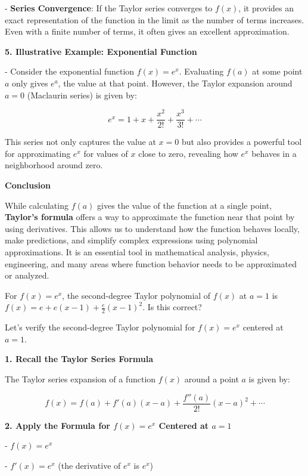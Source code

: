 \documentclass[a4paper,12pt]{book}
\begin{document}
- \textbf{Series Convergence}: If the Taylor series converges to \( f(x) \), it provides an exact representation of the function in the limit as the number of terms increases. Even with a finite number of terms, it often gives an excellent approximation.

\textbf{5. Illustrative Example: Exponential Function}

- Consider the exponential function \( f(x) = e^x \). Evaluating \( f(a) \) at some point \( a \) only gives \( e^a \), the value at that point. However, the Taylor expansion around \( a = 0 \) (Maclaurin series) is given by:

\[
  e^x = 1 + x + \frac{x^2}{2!} + \frac{x^3}{3!} + \cdots
\]
  
  This series not only captures the value at \( x = 0 \) but also provides a powerful tool for approximating \( e^x \) for values of \( x \) close to zero, revealing how \( e^x \) behaves in a neighborhood around zero.

\textbf{Conclusion}

While calculating \( f(a) \) gives the value of the function at a single point, \textbf{Taylor’s formula} offers a way to approximate the function near that point by using derivatives. This allows us to understand how the function behaves locally, make predictions, and simplify complex expressions using polynomial approximations. It is an essential tool in mathematical analysis, physics, engineering, and many areas where function behavior needs to be approximated or analyzed.

\begin{bluebox}
For \(f(x)=e^x\), the second-degree Taylor polynomial of \(f(x)\) at \(a=1\) is \( f(x) = e + e(x-1) + \frac{e}{2} (x-1)^2 \). Is this correct?
\end{bluebox}

Let's verify the second-degree Taylor polynomial for \( f(x) = e^x \) centered at \( a = 1 \).

\textbf{1. Recall the Taylor Series Formula}

The Taylor series expansion of a function \( f(x) \) around a point \( a \) is given by:

\[
f(x) = f(a) + f'(a)(x - a) + \frac{f''(a)}{2!}(x - a)^2 + \cdots
\]


\textbf{2. Apply the Formula for \( f(x) = e^x \) Centered at \( a = 1 \)}

- \( f(x) = e^x \)

- \( f'(x) = e^x \) (the derivative of \( e^x \) is \( e^x \))
\end{document}
